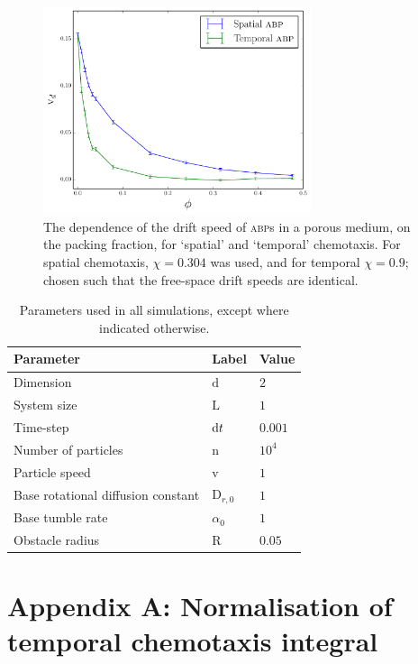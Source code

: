 \documentclass[a4wide,11pt]{article}
\begin{document}
\begin{figure}
    \centering
    \includegraphics[width=0.7\textwidth]{img/vd_of_packing.pdf}
    \caption{The dependence of the drift speed of \textsc{abp}s in a porous medium, on the packing fraction, for `spatial' and `temporal' chemotaxis. For spatial chemotaxis, $\chi=0.304$ was used, and for temporal $\chi=0.9$; chosen such that the free-space drift speeds are identical.}
    \label{vd_of_packing}
\end{figure}

\begin{table}
    \centering
    \begin{tabu} to \linewidth {lll}
        \toprule
        Parameter & Label & Value \\
        \midrule
        Dimension & $\mathrm{d}$ & $2$ \\
        System size & $\mathrm{L}$ & $1$ \\
        Time-step & $\dif t$ & $0.001$ \\
        Number of particles & $\mathrm{n}$ & $10^4$ \\
        Particle speed & $\mathrm{v}$ & $1$ \\
        Base rotational diffusion constant & $\mathrm{D}_{r,0}$ & $1$ \\
        Base tumble rate & $\alpha_0$ & $1$ \\
        Obstacle radius & $\mathrm{R}$ & $0.05$ \\
        \bottomrule
    \end{tabu}
    \caption{Parameters used in all simulations, except where indicated otherwise.}
\end{table}

\section*{Appendix A: Normalisation of temporal chemotaxis integral}
\end{document}
